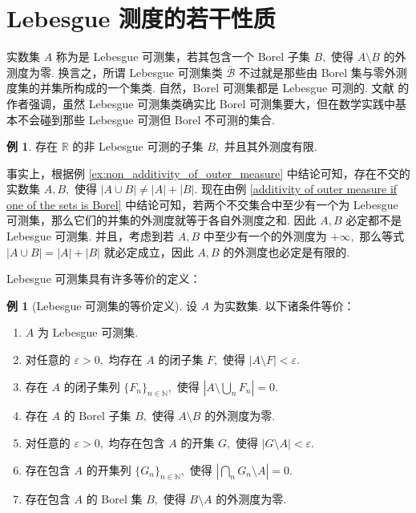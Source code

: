 \documentclass[12pt, a4paper, oneside]{book}
\numberwithin{figure}{section}
\theoremstyle{definition}
\newtheorem{example}[theorem]{例}
\begin{document}
\section{Lebesgue 测度的若干性质}
实数集 $A$ 称为是 Lebesgue 可测集，若其包含一个 Borel 子集 $B,$ 使得 $A\setminus B$ 的外测度为零. 换言之，所谓 Lebesgue 可测集类 $\overline{\mathcal B}$ 不过就是那些由 Borel 集与零外测度集的并集所构成的一个集类. 自然，Borel 可测集都是 Lebesgue 可测的. 
文献 \cite{Axler_2020} 的作者强调，虽然 Lebesgue 可测集类确实比 Borel 可测集要大，但在数学实践中基本不会碰到那些 Lebesgue 可测但 Borel 不可测的集合.

\begin{example}\label{ex:existence of non-Lebesgue measurable sets}
    存在 $\mathbb R$ 的非 Lebesgue 可测的子集 $B,$ 并且其外测度有限.
\end{example}

事实上，根据例 \eqref{ex:non_additivity_of_outer_measure} 中结论可知，存在不交的实数集 $A,B,$ 使得 $|A\cup B|\neq |A|+|B|.$ 
现在由例 \eqref{additivity of outer measure if one of the sets is Borel} 中结论可知，若两个不交集合中至少有一个为 Lebesgue 可测集，那么它们的并集的外测度就等于各自外测度之和.
因此 $A,B$ 必定都不是 Lebesgue 可测集. 并且，考虑到若 $A,B$ 中至少有一个的外测度为
$+\infty,$ 那么等式 $|A\cup B|=|A|+|B|$ 就必定成立，因此 $A,B$ 的外测度也必定是有限的.


Lebesgue 可测集具有许多等价的定义：
\begin{example}[Lebesgue 可测集的等价定义]\label{ex:equivalent definitions of Lebesgue measurable sets}
    设 $A$ 为实数集. 以下诸条件等价：
    \begin{enumerate}[label=\alph*)]
        \item $A$ 为 Lebesgue 可测集.
        \item 对任意的 $\varepsilon>0,$ 均存在 $A$ 的闭子集 $F,$ 使得 $|A\setminus F|<\varepsilon.$
        \item 存在 $A$ 的闭子集列 $\{F_n\}_{n\in\mathbb N},$ 使得 $|A\setminus\bigcup_n F_n|=0.$ 
        \item 存在 $A$ 的 Borel 子集 $B,$ 使得 $A\setminus B$ 的外测度为零.
        \item 对任意的 $\varepsilon>0,$ 均存在包含 $A$ 的开集 $G,$ 使得 $|G\setminus A|<\varepsilon.$
        \item 存在包含 $A$ 的开集列 $\{G_n\}_{n\in\mathbb N},$ 使得 $|\bigcap_n G_n\setminus A|=0.$ 
        \item 存在包含 $A$ 的 Borel 集 $B,$ 使得 $B\setminus A$ 的外测度为零.
    \end{enumerate}
\end{example}
\end{document}
